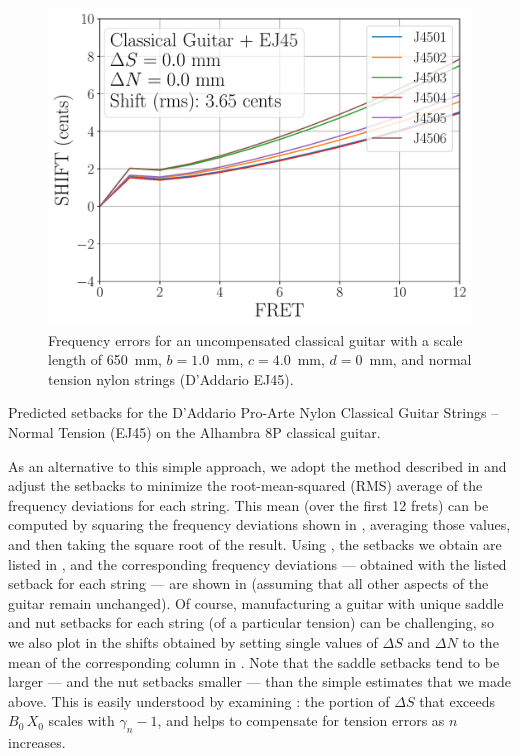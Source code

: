 \begin{figure}
  \centering
  \includegraphics[width=5.0in]{../figures/shift_classicalguitar_ej45_null}
  \caption{\label{fig:shift_classicalguitar_ej45_null} Frequency errors for an uncompensated classical guitar with a scale length of 650~mm, $b = 1.0$~mm, $c = 4.0$~mm, $d = 0$~mm, and normal tension nylon strings (D'Addario EJ45).}
\end{figure}

\begin{table}%
  \centering
  \caption{\label{tbl:ej45_setbacks} Predicted setbacks for the D'Addario Pro-Arte Nylon Classical Guitar Strings -- Normal Tension (EJ45) on the Alhambra 8P classical guitar.}
  
\end{table}%

As an alternative to this simple approach, we adopt the method described in  and adjust the setbacks to minimize the root-mean-squared (RMS) average of the frequency deviations for each string. This mean (over the first 12 frets) can be computed by squaring the frequency deviations shown in , averaging those values, and then taking the square root of the result. Using , the setbacks we obtain are listed in , and the corresponding frequency deviations --- obtained with the listed setback for each string --- are shown in  (assuming that all other aspects of the guitar remain unchanged). Of course, manufacturing a guitar with unique saddle and nut setbacks for each string (of a particular tension) can be challenging, so we also plot in  the shifts obtained by setting single values of $\Delta S$ and $\Delta N$ to the mean of the corresponding column in  . Note that the saddle setbacks tend to be larger --- and the nut setbacks smaller --- than the simple estimates that we made above. This is easily understood by examining : the portion of $\Delta S$ that exceeds $B_0\, X_0$ scales with $\gamma_n - 1$, and helps to compensate for tension errors as $n$ increases.

